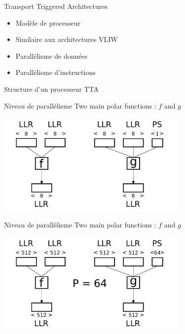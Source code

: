 \begin{frame}[c]{Transport Triggered Architectures}
  \begin{itemize}
    \item Modèle de processeur
    \vspace{0.5cm}
    \item Similaire aux architectures VLIW
    \vspace{0.5cm}
    \item Parallélisme de données
    \vspace{0.5cm}
    \item Parallélisme d'instructions
  \end{itemize}
\end{frame}

\begin{frame}[c]{Structure d'un processeur TTA}
\end{frame}

\begin{frame}[c]{Niveau de parallélisme}
  Two main polar functions : $f$ and $g$
  \vspace{1cm}

  \includegraphics[width=0.7\textwidth]{fig/f_g_dimensions_scalar}
\end{frame}

\begin{frame}[c]{Niveau de parallélisme}
  Two main polar functions : $f$ and $g$
  \vspace{1cm}

  \includegraphics[width=0.7\textwidth]{fig/f_g_dimensions_vector}
\end{frame}


